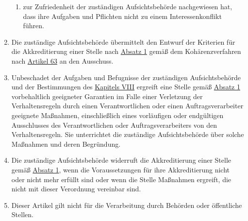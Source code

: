 \begin{enumerate}
\begin{enumerate}
    \item zur Zufriedenheit der zuständigen Aufsichtsbehörde nachgewiesen hat, dass ihre Aufgaben und Pflichten nicht zu
     einem Interessenkonflikt führen.
    \label{itm:41-2d}

  \end{enumerate}

  \item Die zuständige Aufsichtsbehörde übermittelt den Entwurf der Kriterien für die Akkreditierung einer Stelle nach
   \hyperref[itm:41-1]{Absatz 1} gemäß dem Kohärenzverfahren nach \hyperref[ch:63]{Artikel 63} an den Ausschuss.
  \label{itm:41-3}

  \item Unbeschadet der Aufgaben und Befugnisse der zuständigen Aufsichtsbehörde und der Bestimmungen des \hyperref
   [part:8]{Kapitels VIII} ergreift eine Stelle gemäß \hyperref[itm:41-1]{Absatz 1} vorbehaltlich geeigneter Garantien
   im Falle einer Verletzung der Verhaltensregeln durch einen Verantwortlichen oder einen Auftragsverarbeiter geeignete
   Maßnahmen, einschließlich eines vorläufigen oder endgültigen Ausschlusses des Verantwortlichen oder
   Auftragsverarbeiters von den Verhaltensregeln. Sie unterrichtet die zuständige Aufsichtsbehörde über solche
   Maßnahmen und deren Begründung.
  \label{itm:41-4}

  \item Die zuständige Aufsichtsbehörde widerruft die Akkreditierung einer Stelle gemäß \hyperref[itm:41-1]{Absatz 1},
   wenn die Voraussetzungen für ihre Akkreditierung nicht oder nicht mehr erfüllt sind oder wenn die Stelle Maßnahmen
   ergreift, die nicht mit dieser Verordnung vereinbar sind.
  \label{itm:41-5}

  \item Dieser Artikel gilt nicht für die Verarbeitung durch Behörden oder öffentliche Stellen.
  \label{itm:41-6}

\end{enumerate}


